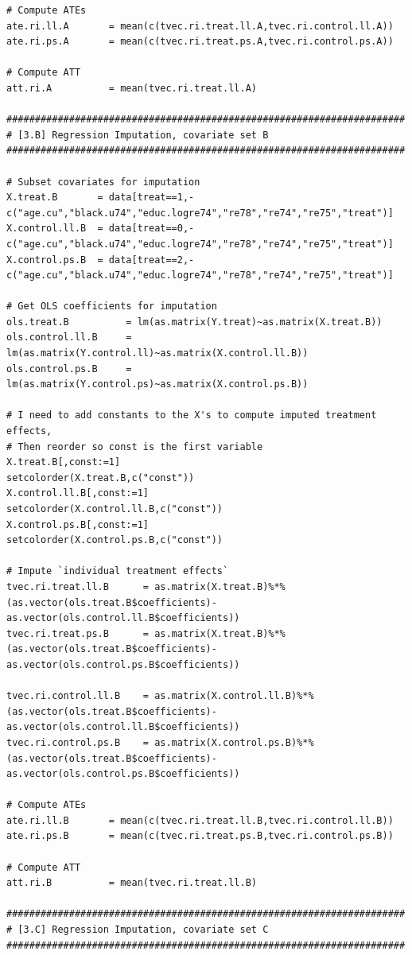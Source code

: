 \documentclass[12pt]{article}
\begin{document}
\begin{verbatim}
# Compute ATEs
ate.ri.ll.A       = mean(c(tvec.ri.treat.ll.A,tvec.ri.control.ll.A))
ate.ri.ps.A       = mean(c(tvec.ri.treat.ps.A,tvec.ri.control.ps.A))

# Compute ATT
att.ri.A          = mean(tvec.ri.treat.ll.A)

######################################################################
# [3.B] Regression Imputation, covariate set B
######################################################################

# Subset covariates for imputation
X.treat.B       = data[treat==1,-c("age.cu","black.u74","educ.logre74","re78","re74","re75","treat")]
X.control.ll.B  = data[treat==0,-c("age.cu","black.u74","educ.logre74","re78","re74","re75","treat")]
X.control.ps.B  = data[treat==2,-c("age.cu","black.u74","educ.logre74","re78","re74","re75","treat")]

# Get OLS coefficients for imputation
ols.treat.B          = lm(as.matrix(Y.treat)~as.matrix(X.treat.B))
ols.control.ll.B     = lm(as.matrix(Y.control.ll)~as.matrix(X.control.ll.B))
ols.control.ps.B     = lm(as.matrix(Y.control.ps)~as.matrix(X.control.ps.B))

# I need to add constants to the X's to compute imputed treatment effects,
# Then reorder so const is the first variable
X.treat.B[,const:=1]
setcolorder(X.treat.B,c("const"))
X.control.ll.B[,const:=1]
setcolorder(X.control.ll.B,c("const"))
X.control.ps.B[,const:=1]
setcolorder(X.control.ps.B,c("const"))

# Impute `individual treatment effects`
tvec.ri.treat.ll.B      = as.matrix(X.treat.B)%*%(as.vector(ols.treat.B$coefficients)-as.vector(ols.control.ll.B$coefficients))
tvec.ri.treat.ps.B      = as.matrix(X.treat.B)%*%(as.vector(ols.treat.B$coefficients)-as.vector(ols.control.ps.B$coefficients))

tvec.ri.control.ll.B    = as.matrix(X.control.ll.B)%*%(as.vector(ols.treat.B$coefficients)-as.vector(ols.control.ll.B$coefficients))  
tvec.ri.control.ps.B    = as.matrix(X.control.ps.B)%*%(as.vector(ols.treat.B$coefficients)-as.vector(ols.control.ps.B$coefficients))  

# Compute ATEs
ate.ri.ll.B       = mean(c(tvec.ri.treat.ll.B,tvec.ri.control.ll.B))
ate.ri.ps.B       = mean(c(tvec.ri.treat.ps.B,tvec.ri.control.ps.B))

# Compute ATT
att.ri.B          = mean(tvec.ri.treat.ll.B)

######################################################################
# [3.C] Regression Imputation, covariate set C
######################################################################


\end{verbatim}
\end{document}
